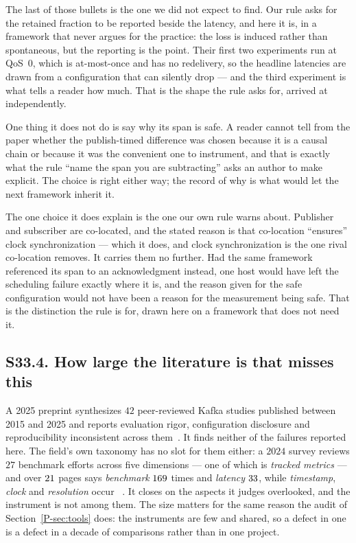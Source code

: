 \documentclass[10pt,journal,onecolumn]{IEEEtran}
\newcommand{\kafka}{Kafka}
\newcommand{\mainTools}{\ref{P-sec:tools}}                %
\begin{document}
The last of those bullets is the one we did not expect to find. Our rule asks for the retained
fraction to be reported beside the latency, and here it is, in a framework that never argues
for the practice: the loss is induced rather than spontaneous, but the reporting is the point.
Their first two experiments run at QoS~$0$, which is at-most-once and has no redelivery, so
the headline latencies are drawn from a configuration that can silently drop --- and the third
experiment is what tells a reader how much. That is the shape the rule asks for, arrived at
independently.

One thing it does not do is say why its span is safe. A reader cannot tell from the paper
whether the publish-timed difference was chosen because it is a causal chain or because it
was the convenient one to instrument, and that is exactly what the rule ``name the span you
are subtracting'' asks an author to make explicit. The choice is right either way; the record
of why is what would let the next framework inherit it.

The one choice it does explain is the one our own rule warns about. Publisher and subscriber
are co-located, and the stated reason is that co-location ``ensures'' clock synchronization
--- which it does, and clock synchronization is the one rival co-location removes. It carries them no further. Had the same framework referenced its span to an
acknowledgment instead, one host would have left the scheduling failure exactly where it
is, and the reason given for the safe configuration would not have been a reason for the
measurement being safe. That is the distinction the rule is for, drawn here on a framework
that does not need it.

\subsection{S33.4. How large the literature is that misses this}

A 2025 preprint synthesizes $42$ peer-reviewed \kafka{} studies published between 2015 and
2025 and reports evaluation rigor, configuration disclosure and reproducibility inconsistent
across them~\cite{mohammad2025kafka}. It finds neither of the failures reported
here. The field's own taxonomy has no slot for them either: a $2024$ survey
reviews $27$ benchmark efforts across five dimensions --- one of which is
\emph{tracked metrics} --- and over $21$ pages says
\emph{benchmark} $169$ times and \emph{latency}
$33$, while \emph{timestamp}, \emph{clock} and
\emph{resolution} occur \surveyAbsentTimes{}~\cite{yue2024streamsurvey}. It closes on the aspects it judges overlooked,
and the instrument is not among them. The size
matters for the same reason the audit of Section~\mainTools{} does: the instruments are
few and shared, so a defect in one is a defect in a decade of comparisons rather than in one
project.
\end{document}
